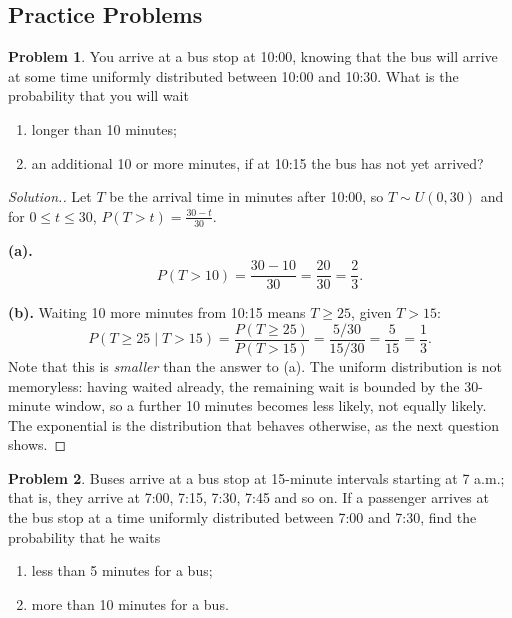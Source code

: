 \documentclass[12pt,a4paper]{report}
\theoremstyle{definition}
\theoremstyle{plain}
\theoremstyle{definition}
\newtheorem{problemx}{Problem}[section]
\newenvironment{problem}{\begin{problemx}}{\end{problemx}}
\newenvironment{solution}
  {\renewcommand{\qedsymbol}{}\begin{proof}[\textit{Solution}.]}
  {\end{proof}}
\begin{document}
\subsection{Practice Problems}

\begin{problem}
You arrive at a bus stop at 10:00, knowing that the bus will arrive at some time
uniformly distributed between 10:00 and 10:30. What is the probability that you will wait
\begin{enumerate}
\item[(a).] longer than 10 minutes;
\item[(b).] an additional 10 or more minutes, if at 10:15 the bus has not yet arrived?
\end{enumerate}
\end{problem}

\begin{solution}
Let $T$ be the arrival time in minutes after 10:00, so $T\sim U(0,30)$ and for
$0\leq t\leq 30$, $P(T>t) = \frac{30-t}{30}$.

\textbf{(a).} \[P(T>10) = \frac{30-10}{30} = \frac{20}{30} = \frac{2}{3}.\]

\textbf{(b).} Waiting 10 more minutes from 10:15 means $T\geq 25$, given $T>15$:
\[P(T\geq 25 \mid T>15) = \frac{P(T\geq 25)}{P(T>15)} = \frac{5/30}{15/30}
 = \frac{5}{15} = \frac{1}{3}.\]
Note that this is \emph{smaller} than the answer to (a). The uniform distribution is not
memoryless: having waited already, the remaining wait is bounded by the 30-minute window,
so a further 10 minutes becomes less likely, not equally likely. The exponential is the
distribution that behaves otherwise, as the next question shows.
\end{solution}

\begin{problem}
Buses arrive at a bus stop at 15-minute intervals starting at 7 a.m.; that is, they
arrive at 7:00, 7:15, 7:30, 7:45 and so on. If a passenger arrives at the bus stop at a
time uniformly distributed between 7:00 and 7:30, find the probability that he waits
\begin{enumerate}
\item[(a).] less than 5 minutes for a bus;
\item[(b).] more than 10 minutes for a bus.
\end{enumerate}
\end{problem}
\end{document}
